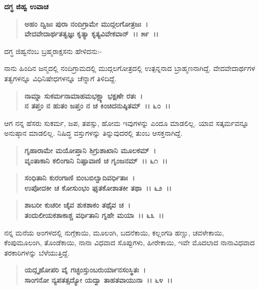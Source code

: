 \begin{flushleft}
\textbf{ದಗ್ಧ ಜಿಹ್ವ ಉವಾಚ\enginline{-}}
\end{flushleft}

\begin{verse}
\textbf{ಅಹಂ ದ್ವಿಜಃ ಪುರಾ ನಂದಿಗ್ರಾಮೇ ಮುದ್ಗಲಗೋತ್ರಜಃ~।}\\\textbf{ವೇದವೇದಾರ್ಥತತ್ವಜ್ಞಃ ಕೃತ್ಯಾ ಕೃತ್ಯವಿವೇಕವಾನ್~।। ೫೯~।।}
\end{verse}

\begin{flushleft}
ದಗ್ಧ ಜಿಹ್ವನೆಂಬ ಬ್ರಹ್ಮರಾಕ್ಷಸನು ಹೇಳಿದನು:-
\end{flushleft}

ನಾನು ಹಿಂದಿನ ಜನ್ಮದಲ್ಲಿ ನಂದಿಗ್ರಾಮದಲ್ಲಿ ಮುದ್ಗಲಗೋತ್ರದಲ್ಲಿ ಉತ್ಪನ್ನನಾದ ಬ್ರಾಹ್ಮಣನಾಗಿದ್ದೆ. ವೇದವೇದಾರ್ಥಗಳ ತತ್ವಗಳನ್ನೂ ವಿಧಿನಿಷೇಧಗಳನ್ನೂ ಚೆನ್ನಾಗೆ ತಿಳಿದಿದ್ದೆ.

\begin{verse}
\textbf{ನಾಮ್ನಾ ಸುಕರ್ಮನಾಮಾಹಮಭಕ್ಷ್ಯಾ ಭಕ್ಷಣೇ ರತಃ~।}\\\textbf{ನ ತಪ್ತಂ ನ ಹುತಂ ಜಪ್ತಂ ನ ಚ ಕಿಂಚಿದನುಷ್ಠಿತಮ್~।। ೬೦~।।}
\end{verse}

ಆಗ ನನ್ನ ಹೆಸರು ಸುಕರ್ಮ, ಜಪ, ತಪಸ್ಸು, ಹೋಮ ಇವುಗಳನ್ನು ಎಂದೂ ಮಾಡಲಿಲ್ಲ. ಯಾವ ಸತ್ಕರ್ಮವನ್ನೂ ಅನುಷ್ಠಾನ ಮಾಡಲಿಲ್ಲ. ನಿಷಿದ್ಧ ವಸ್ತುಗಳನ್ನು ತಿನ್ನುವುದರಲ್ಲಿ ತುಂಬ ಆಸಕ್ತನಾಗಿದ್ದೆ.

\begin{verse}
\textbf{ಗೃಹಾರಾಮೇ ಮಯೋಪ್ತಾನಿ ಶಿಗ್ರುಶಾಖಾನಿ ಮೂಲಕಮ್~।}\\\textbf{ವೃಂತಾಕಾನಿ ಕಲಿಂಗಾನಿ ನಿಷ್ಪಾವಾಣಿ ಚ ಗೃಂಜನಮ್~।। ೬೧~।।} 
\end{verse}

\begin{verse}
\textbf{ಸಂಧಿತಾನಿ ಕುರಂಗಾಣಿ ಬಿಂಬಬಿಲ್ವಾದಿವರ್ಧಿತಾಃ~।}\\\textbf{ಉಪೋದಕೀ ಚ ಕೋಸುಂಭಂ ಘೃತಕೋಶಾತಕೀ ತಥಾ~।। ೬೨~।।}
\end{verse}

\begin{verse}
\textbf{ಶಾಬರೀ ಕುಚರೀ ಚೈವ ಶುಕಶಾಕಂ ತಥೈವ ಚ~।}\\\textbf{ತಂದುಲೀಯಕಶಾಕಾಶ್ಚ ವರ್ಧಿತಾನಿ ಗೃಹೇ ಮಯಾ~।। ೬೩~।।}
\end{verse}

ನನ್ನ ಮನೆಯ ಅಂಗಳದಲ್ಲಿ ನುಗ್ಗೆಕಾಯಿ, ಮೂಲಂಗಿ, ಬದನೆಕಾಯಿ, ಕಲ್ಲಂಗಡಿ ಹಣ್ಣು, ಚವಳೇಕಾಯಿ, ಕೆಂಪುಮೂಲಂಗಿ, ತೊಂಡೆಕಾಯಿ, ನಾನಾ ವಿಧವಾದ ಸೊಪ್ಪುಗಳು, ಹೀರೇಕಾಯಿ, ಇವೇ ಮೊದಲಾದ ನಾನಾವಿಧವಾದ ತರಕಾರಿಗಳನ್ನು ಬೆಳೆಯುತ್ತಿದ್ದೆ.

\begin{verse}
\textbf{ಯದ್ಗೃಹೋಪರಿ ವೈ ಗಚ್ಛಂಸ್ತುಂಬರುರ್ಯಾನಸಂಸ್ಥಿತಃ~।}\\\textbf{ಸಾಂಗನೋ ನ್ಯಪತತ್ಸದ್ಯೋ ಯದ್ವಾ ತಾಹತವಾಯುನಾ~।। ೬೪~।।}
\end{verse}

